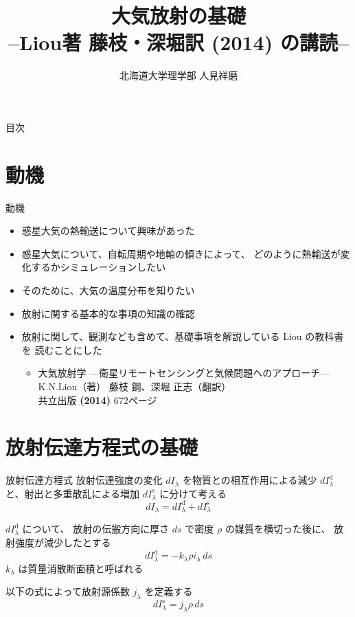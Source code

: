 \documentclass[unicode,colorlinks]{beamer}
\title{大気放射の基礎\\--Liou著 藤枝・深堀訳 (2014) の講読--}
\author{北海道大学理学部 人見祥磨}
\date{\warekitoday}
\begin{document}
\maketitle
\mleftright

\begin{frame}{目次}
	\tableofcontents
\end{frame}

\section{動機}

\begin{frame}{動機}
	\begin{itemize}
		\item 惑星大気の熱輸送について興味があった
		\item 惑星大気について、自転周期や地軸の傾きによって、
			どのように熱輸送が変化するかシミュレーションしたい
		\item そのために、大気の温度分布を知りたい
		\item 放射に関する基本的な事項の知識の確認
		\item 放射に関して、観測なども含めて、基礎事項を解説している Liou の教科書を
			読むことにした
			\begin{itemize}
				\item 大気放射学 {\scriptsize---衛星リモートセンシングと気候問題へのアプローチ---}\\
					K.N.Liou（著） 藤枝 鋼、深堀 正志（翻訳）\\
					共立出版 \textbf{(2014)} 672ページ
			\end{itemize}
	\end{itemize}
\end{frame}


\section{放射伝達方程式の基礎}

\begin{frame}{放射伝達方程式}
	放射伝達強度の変化 $dI_\lambda$ を物質との相互作用による減少
	$dI_\lambda^\mathrm{d}$ と、射出と多重散乱による増加
	$dI_\lambda^\mathrm{s}$ に分けて考える
	\[dI_\lambda=dI_\lambda^\mathrm{d}+dI_\lambda^\mathrm{s}\]

	$dI_\lambda^\mathrm{d}$ について、
	放射の伝搬方向に厚さ $ds$ で密度 $\rho$ の媒質を横切った後に、
	放射強度が減少したとする
	\[dI_\lambda^\mathrm{d}=-k_\lambda\rho i_\lambda\,ds\]
	$k_\lambda$ は質量消散断面積と呼ばれる

	以下の式によって放射源係数 $j_\lambda$ を定義する
	\[dI_\lambda^\mathrm{s}=j_\lambda\rho\,ds\]
\end{frame}
\end{document}
